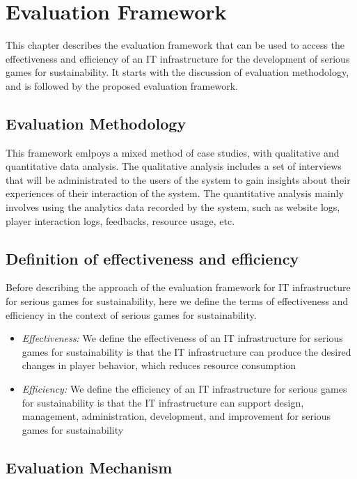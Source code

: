 \chapter{Evaluation Framework}
\label{cha:framework-description}
This chapter describes the evaluation framework that can be used to access the effectiveness and efficiency of an IT infrastructure for the development of serious games for sustainability. It starts with the discussion of evaluation methodology, and is followed by the proposed evaluation framework.

\section{Evaluation Methodology}
This framework emlpoys a mixed method of case studies, with qualitative and quantitative data analysis. The qualitative analysis includes a set of interviews that will be administrated to the users of the system to gain insights about their experiences of their interaction of the system. The quantitative analysis mainly involves using the analytics data recorded by the system, such as website logs, player interaction logs,  feedbacks, resource usage, etc.

\section{Definition of effectiveness and efficiency}

Before describing the approach of the evaluation framework for IT infrastructure for serious games for sustainability, here we define the terms of effectiveness and efficiency in the context of serious games for sustainability.

\begin{itemize}
    \item \emph{Effectiveness:} We define the effectiveness of an IT infrastructure for serious games for sustainability is that the IT infrastructure can produce the desired changes in player behavior, which reduces resource consumption

    \item \emph{Efficiency:} We define the efficiency of an IT infrastructure for serious games for sustainability is that the IT infrastructure can support design,  management, administration, development, and improvement for serious games for sustainability
\end{itemize}

\section{Evaluation Mechanism}

